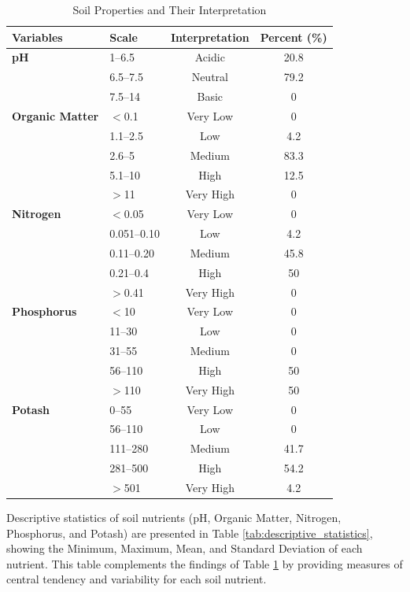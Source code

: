 \begin{table}[H]
    \centering
    \caption{Soil Properties and Their Interpretation}
    \label{tab:soil_properties}
    \begin{tabular}{llcc}
        \toprule
        \textbf{Variables} & \textbf{Scale} & \textbf{Interpretation} & \textbf{Percent (\%)} \\
        \midrule
        \textbf{pH} & 1--6.5 & Acidic & 20.8 \\
        & 6.5--7.5 & Neutral & 79.2 \\
        & 7.5--14 & Basic & 0 \\
        \midrule
        \textbf{Organic Matter} & $<$0.1 & Very Low & 0 \\
        & 1.1--2.5 & Low & 4.2 \\
        & 2.6--5 & Medium & 83.3 \\
        & 5.1--10 & High & 12.5 \\
        & $>$11 & Very High & 0 \\
        \midrule
        \textbf{Nitrogen} & $<$0.05 & Very Low & 0 \\
        & 0.051--0.10 & Low & 4.2 \\
        & 0.11--0.20 & Medium & 45.8 \\
        & 0.21--0.4 & High & 50 \\
        & $>$0.41 & Very High & 0 \\
        \midrule
        \textbf{Phosphorus} & $<$10 & Very Low & 0 \\
        & 11--30 & Low & 0 \\
        & 31--55 & Medium & 0 \\
        & 56--110 & High & 50 \\
        & $>$110 & Very High & 50 \\
        \midrule
        \textbf{Potash} & 0--55 & Very Low & 0 \\
        & 56--110 & Low & 0 \\
        & 111--280 & Medium & 41.7 \\
        & 281--500 & High & 54.2 \\
        & $>$501 & Very High & 4.2 \\
        \bottomrule
    \end{tabular}
\end{table}

Descriptive statistics of soil nutrients (pH, Organic Matter, Nitrogen, Phosphorus, and Potash) are presented in Table \ref{tab:descriptive_statistics}, showing the Minimum, Maximum, Mean, and Standard Deviation of each nutrient. This table complements the findings of Table \ref{tab:soil_properties} by providing measures of central tendency and variability for each soil nutrient.


